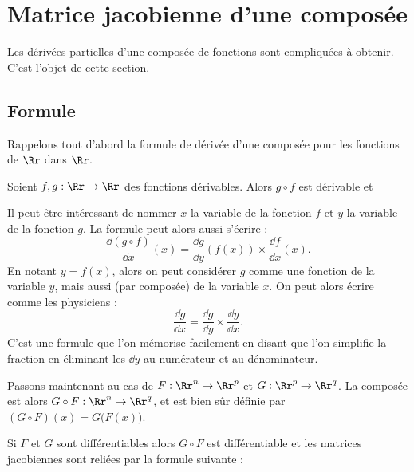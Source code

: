 \documentclass[11pt, class=report,crop=false]{standalone}
\begin{document}
\section{Matrice jacobienne d'une composée}


Les dérivées partielles d'une composée de fonctions sont compliquées à obtenir. C'est l'objet de cette section.

\subsection{Formule}

Rappelons tout d'abord la formule de dérivée d'une composée pour les fonctions de $\Rr$ dans $\Rr$.

\begin{proposition}
Soient $f,g : \Rr \to \Rr$ des fonctions dérivables. Alors $g \circ f$ est dérivable et 
\end{proposition}





\begin{remarque*}
Il peut être intéressant de nommer $x$ la variable de la fonction $f$ et $y$ la variable de la fonction $g$. La formule peut alors aussi s'écrire :
$$
\frac{\dd (g \circ f)}{\dd x}(x) = \frac{\dd g}{\dd y}(f(x)) \times \frac{\dd f}{\dd x}(x).$$
En notant $y=f(x)$, alors on peut considérer $g$ comme une fonction de la variable $y$, mais aussi (par composée) de la variable $x$. On peut alors écrire comme les physiciens :
$$\frac{\dd g}{\dd x} = \frac{\dd g}{\dd y} \times \frac{\dd y}{\dd x}.$$
C'est une formule que l'on mémorise facilement en disant que l'on simplifie la fraction en éliminant les $\dd y$ au numérateur et au dénominateur.
\end{remarque*}

\bigskip

Passons maintenant au cas de $F : \Rr^n \to \Rr^p$ et $G : \Rr^p \to \Rr^q$. La composée est alors $G \circ F : \Rr^n \to \Rr^q$, et est bien sûr définie par $(G \circ F)(x) = G \big( F(x) \big)$.


\begin{theoreme}
Si $F$ et $G$ sont différentiables alors $G \circ F$ est différentiable et
les matrices jacobiennes sont reliées par la formule suivante :
\end{theoreme}
\end{document}
